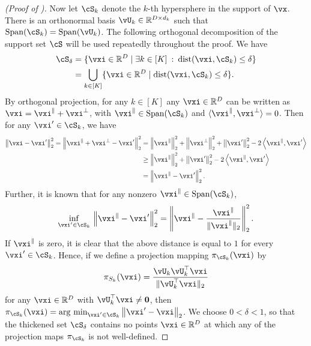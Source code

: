 \documentclass[../../book-main.tex]{subfiles}
\begin{document}
\begin{proof}[(Proof of )]
    Now let $\cS_k$ denote the $k$-th hypersphere in the support of $\vx$.
    There is an orthonormal basis $\vU_{k} \in \R^{D \times d_k}$ such that
    $\Span(\cS_k) = \Span(\vU_k)$.
    The following orthogonal decomposition of the support set $\cS$
    will be used repeatedly throughout the proof. 
    We have
    \begin{align}
        \cS_{\delta} 
        &= \set{\vxi \in \R^D \given \exists k \in [K] \::\: \dist(\vxi,
        \cS_k) \leq \delta}
        \\
        &= \bigcup_{k \in [K]} \set{\vxi \in \R^D \given \dist(\vxi,
        \cS_k) \leq \delta}.
    \end{align}
    By orthogonal projection, for any $k \in [K]$ any $\vxi \in \R^D$ can be
    written as $\vxi = \vxi^{\|} + \vxi^{\perp}$, with $\vxi^{\|} \in \Span(\cS_k)$
    and $\ip{\vxi^{\|}}{\vxi^\perp} = 0$.
    Then for any $\vxi' \in \cS_k$, we have
    \begin{align}
        \norm*{\vxi - \vxi'}_2^2 
        = 
        \norm*{\vxi^{\|} + \vxi^{\perp} - \vxi'}_2^2
        &=
        \norm*{\vxi^{\|}}_2^2 + \norm*{\vxi^{\perp}}_2^2 + \norm*{\vxi'}_2^2
        - 2 \ip*{\vxi^{\|}}{\vxi'}
        \\
        &\geq
        \norm*{\vxi^{\|}}_2^2 + \norm*{\vxi'}_2^2
        - 2 \ip*{\vxi^{\|}}{\vxi'}
        \\
        &=
        \norm*{\vxi^{\|} - \vxi'}_2^2.
    \end{align}
    Further, it is known that for any nonzero $\vxi^{\|} \in \Span(\cS_k)$,
    \begin{equation}
        \inf_{\vxi' \in \cS_k}\,
        \norm*{\vxi^{\|} - \vxi'}_2^2
        =
        \norm*{\vxi^{\|} - \frac{\vxi^{\|}}{\norm{\vxi^{\|}}_2}}_2^2.
    \end{equation}
    If $\vxi^{\|}$ is zero, it is clear that the above distance is equal to $1$
    for every $\vxi' \in \cS_k$.
    Hence, if we define a projection mapping
    $\pi_{\cS_k}(\vxi)$
    by
    \begin{equation}
        \pi_{S_k}(\vxi) = \frac{\vU_k\vU_k^\top \vxi}{\norm{\vU_k^\top \vxi}_2}
    \end{equation}
    for any $\vxi \in \R^D$ with $\vU_k^\top \vxi \neq \mathbf{0}$, then 
    $\pi_{\cS_k}(\vxi) = \argmin_{\vxi' \in \cS_k}\norm*{\vxi' - \vxi}_2$.
    We choose $0 < \delta < 1$, so that the thickened set $\cS_{\delta}$
    contains no points $\vxi \in \R^D$ at which any of the projection maps
    $\pi_{\cS_k}$ is not well-defined.

\end{proof}
\end{document}
